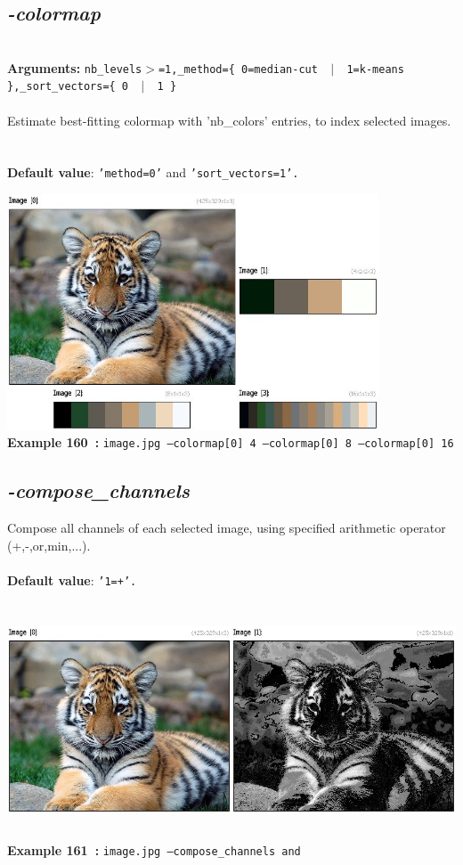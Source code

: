 \documentclass[a4paper,11pt,twoside]{book}
\begin{document}
\subsection{\emph{-colormap} }\vspace*{-0.5em}
~\\\textbf{Arguments: } 
{\small \texttt{nb\_levels$>$=1,\_method=\{ 0=median-cut ~$|$~ 1=k-means \},\_sort\_vectors=\{ 0 ~$|$~ 1 \}}}\\~\\
Estimate best-fitting colormap with 'nb\_colors' entries, to index selected images.
~\\~\\\textbf{Default value}: {\small \texttt{'method=0'} and \texttt{'sort\_vectors=1'.}}
\begin{center}\includegraphics[keepaspectratio=true,height=7cm,width=\textwidth]{img/gmic_def160.jpg}\\
{\footnotesize \textbf{Example 160~:} \texttt{image.jpg --colormap[0] 4 --colormap[0] 8 --colormap[0] 16}}
\end{center}

\subsection{\emph{-compose\_channels} }\vspace*{-0.5em}
Compose all channels of each selected image, using specified arithmetic operator (+,-,or,min,...).
~\\~\\\textbf{Default value}: {\small \texttt{'1=+'.}}
\begin{center}\includegraphics[keepaspectratio=true,height=7cm,width=\textwidth]{img/gmic_def161.jpg}\\
{\footnotesize \textbf{Example 161~:} \texttt{image.jpg --compose\_channels and}}
\end{center}
\end{document}
